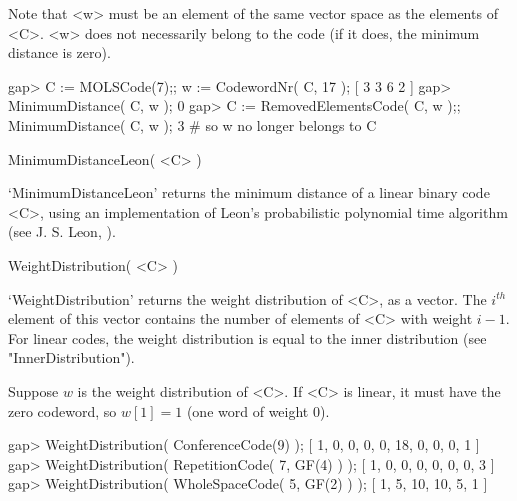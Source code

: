 Note that <w> must be an element of the same vector space as the elements
of <C>.  <w> does not necessarily belong  to  the code  (if it  does, the
minimum distance is zero).

\beginexample
gap> C := MOLSCode(7);; w := CodewordNr( C, 17 );
[ 3 3 6 2 ]
gap> MinimumDistance( C, w );
0
gap> C := RemovedElementsCode( C, w );; MinimumDistance( C, w );
3                           # so w no longer belongs to C 
\endexample

\>MinimumDistanceLeon( <C> )

`MinimumDistanceLeon'  returns  the  minimum distance   of a linear
binary code <C>, using an implementation of Leon's probabilistic
polynomial time algorithm (see J. S. Leon, \cite{Leon88}).







\>WeightDistribution( <C> )

`WeightDistribution'  returns   the weight distribution    of  <C>, as  a
vector. The    $i^{th}$ element of  this  vector  contains the  number of
elements of  <C>   with  weight $i-1$.  For   linear  codes, the   weight
distribution  is     equal    to     the    inner    distribution    (see
"InnerDistribution").

Suppose $w$ is the weight distribution of <C>. If <C>  is linear, it must
have the zero codeword, so $w[1] = 1$ (one word of weight 0).

\beginexample
gap> WeightDistribution( ConferenceCode(9) );
[ 1, 0, 0, 0, 0, 18, 0, 0, 0, 1 ]
gap> WeightDistribution( RepetitionCode( 7, GF(4) ) );
[ 1, 0, 0, 0, 0, 0, 0, 3 ]
gap> WeightDistribution( WholeSpaceCode( 5, GF(2) ) );
[ 1, 5, 10, 10, 5, 1 ] 
\endexample

